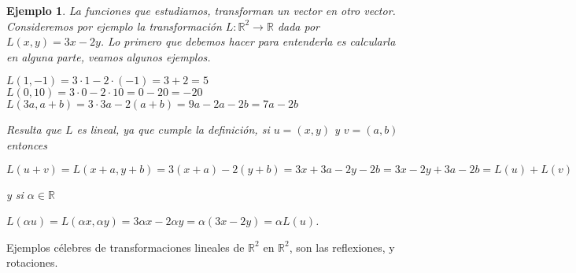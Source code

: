\documentclass[12pt]{book}
\newtheorem{ejem}{Ejemplo}
\def\R{\mathbb{R}}
\begin{document}
\begin{ejem}\label{eje:primera}
La funciones que estudiamos, transforman un vector en otro vector.
Consideremos por ejemplo la transformación $L:\R^2\rightarrow \R$ dada por $L(x,y)=3x-2y$.
Lo primero que debemos hacer para entenderla es calcularla en alguna parte, veamos algunos ejemplos.

$L(1,-1)=3\cdot 1-2\cdot(-1)=3+2=5$\\
$L(0,10)=3\cdot 0 -2\cdot10=0-20=-20$\\
$L(3a,a+b)=3\cdot3a-2(a+b)=9a-2a-2b=7a-2b$

Resulta que $L$ es lineal, ya que cumple la definición, si $u=(x,y)$ y $v=(a,b)$ entonces

$L(u+v)=L(x+a,y+b)=3(x+a)-2(y+b)=3x+3a-2y-2b=3x-2y+3a-2b=L(u)+L(v)$ 

y si $\alpha\in\R$

$L(\alpha u)=L(\alpha x,\alpha y)=3\alpha x-2\alpha y=\alpha(3x-2y)=\alpha L(u)$.
\end{ejem}

Ejemplos célebres de  transformaciones lineales de $\R^2$ en $\R^2$, son las reflexiones, y rotaciones.

\bigskip
\end{document}

